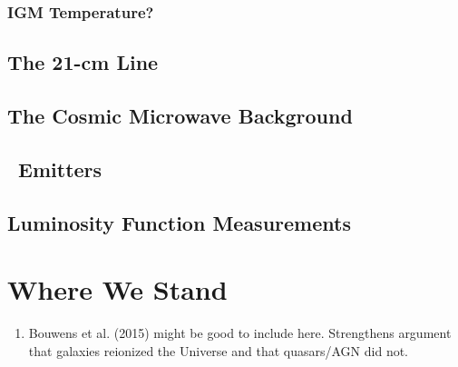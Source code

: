 \subsubsection{IGM Temperature?}

\subsection{The 21-cm Line}
\subsection{The Cosmic Microwave Background}
\subsection{\lya\ Emitters}
\subsection{Luminosity Function Measurements}

\section{Where We Stand}

\begin{enumerate}
\item Bouwens et al. (2015) might be good to include here. Strengthens argument that galaxies reionized the Universe and that quasars/AGN did not.
\end{enumerate}



